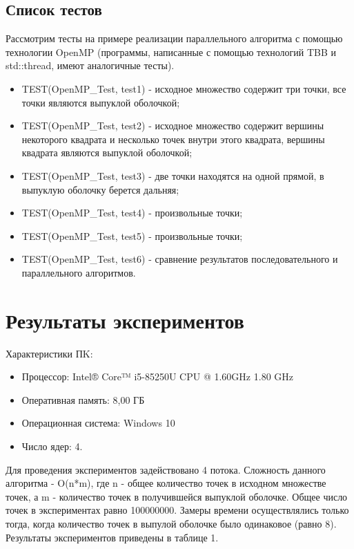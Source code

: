 \documentclass{report}
\begin{document}
\subsection{Список тестов}

Рассмотрим тесты на примере реализации параллельного алгоритма с помощью технологии OpenMP (программы, написанные с помощью технологий TBB и std::thread, имеют аналогичные тесты).

\begin{itemize}
\item TEST(OpenMP\_Test, test1) - исходное множество содержит три точки, все точки являются выпуклой оболочкой;
\item TEST(OpenMP\_Test, test2) - исходное множество содержит вершины некоторого квадрата и несколько точек внутри этого квадрата, вершины квадрата являются выпуклой оболочкой;
\item TEST(OpenMP\_Test, test3) - две точки находятся на одной прямой, в выпуклую оболочку берется дальняя;
\item TEST(OpenMP\_Test, test4) - произвольные точки;
\item TEST(OpenMP\_Test, test5) - произвольные точки;
\item TEST(OpenMP\_Test, test6) - сравнение результатов последовательного и параллельного алгоритмов.
\end{itemize}

\newpage

\section{Результаты экспериментов}

Характеристики ПK:

\begin{itemize}
\item Процессор: Intel® Core™ i5-85250U CPU @ 1.60GHz 1.80 GHz
\item Оперативная память: 8,00 ГБ
\item Операционная система: Windows 10
\item Число ядер: 4.
\end{itemize}


\par Для проведения экспериментов задействовано 4 потока. Сложность данного алгоритма - O(n*m), где n - общее количество точек в исходном множестве точек, а m - количество точек в получившейся выпуклой оболочке. Общее число точек в экспериментах равно 100000000. Замеры времени осуществлялись только тогда, когда количество точек в выпулой оболочке было одинаковое (равно 8). Результаты экспериментов приведены в таблице 1.
\end{document}
